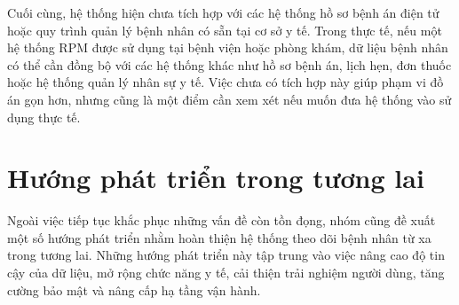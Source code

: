 \par Cuối cùng, hệ thống hiện chưa tích hợp với các hệ thống hồ sơ bệnh án điện tử hoặc quy trình quản lý bệnh nhân có sẵn tại cơ sở y tế. Trong thực tế, nếu một hệ thống RPM được sử dụng tại bệnh viện hoặc phòng khám, dữ liệu bệnh nhân có thể cần đồng bộ với các hệ thống khác như hồ sơ bệnh án, lịch hẹn, đơn thuốc hoặc hệ thống quản lý nhân sự y tế. Việc chưa có tích hợp này giúp phạm vi đồ án gọn hơn, nhưng cũng là một điểm cần xem xét nếu muốn đưa hệ thống vào sử dụng thực tế.

\section{Hướng phát triển trong tương lai}
\par Ngoài việc tiếp tục khắc phục những vấn đề còn tồn đọng, nhóm cũng đề xuất một số hướng phát triển nhằm hoàn thiện hệ thống theo dõi bệnh nhân từ xa trong tương lai. Những hướng phát triển này tập trung vào việc nâng cao độ tin cậy của dữ liệu, mở rộng chức năng y tế, cải thiện trải nghiệm người dùng, tăng cường bảo mật và nâng cấp hạ tầng vận hành.

